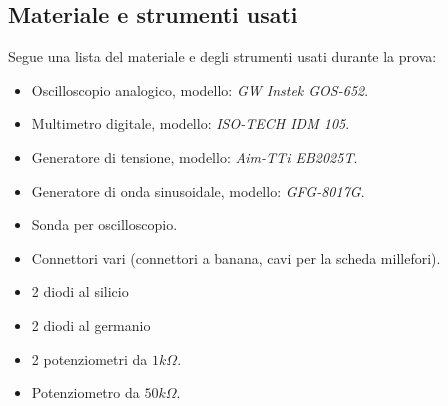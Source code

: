 \subsection{Materiale e strumenti usati}\label{subsec:materiali}
Segue una lista del materiale e degli strumenti usati durante la prova:
\begin{itemize}
  \item%
  Oscilloscopio analogico, modello: \emph{GW Instek GOS-652}.
  \item%
  Multimetro digitale, modello: \emph{ISO-TECH IDM 105}.
  \item%
  Generatore di tensione, modello: \emph{Aim-TTi EB2025T}.
  \item%
  Generatore di onda sinusoidale, modello: \emph{GFG-8017G}.
  \item%
  Sonda per oscilloscopio.
  \item%
  Connettori vari (connettori a banana, cavi per la scheda millefori).
  \item%
  2 diodi al silicio
  \item%
  2 diodi al germanio
  \item
  2 potenziometri da $1k\Omega$.
  \item
  Potenziometro da $50k\Omega$.
\end{itemize}

